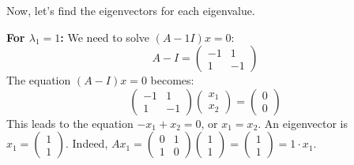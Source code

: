 \documentclass{article}
\begin{document}
Now, let's find the eigenvectors for each eigenvalue.

\textbf{For $\lambda_1 = 1$:}
We need to solve $(A - 1I)x = 0$:
\[A - I = \begin{pmatrix} -1 & 1 \\ 1 & -1 \end{pmatrix}\]
The equation $(A - I)x = 0$ becomes:
\[\begin{pmatrix} -1 & 1 \\ 1 & -1 \end{pmatrix} \begin{pmatrix} x_1 \\ x_2 \end{pmatrix} = \begin{pmatrix} 0 \\ 0 \end{pmatrix}\]
This leads to the equation $-x_1 + x_2 = 0$, or $x_1 = x_2$. An eigenvector is $x_1 = \begin{pmatrix} 1 \\ 1 \end{pmatrix}$. Indeed, $A x_1 = \begin{pmatrix} 0 & 1 \\ 1 & 0 \end{pmatrix} \begin{pmatrix} 1 \\ 1 \end{pmatrix} = \begin{pmatrix} 1 \\ 1 \end{pmatrix} = 1 \cdot x_1$.
\end{document}
